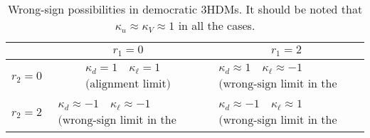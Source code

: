 \documentclass[11pt]{article}
\begin{document}
\begin{table}[h]
\centering
\begin{tabular}{c | c | c }
\hline\hline
& $r_1=0$ & $r_1=2$\\
\hline
$r_2=0$ &  $\begin{matrix} \kappa_d = 1 \quad \kappa_\ell = 1 \\ \text{(alignment limit)} \end{matrix} $ &  $\begin{matrix} \kappa_d \approx 1 \quad \kappa_\ell \approx -1  \\ \text{(wrong-sign limit in the type-X 2HDM)} \end{matrix}$  \\
\hline
$r_2=2$ &  $\begin{matrix} \kappa_d \approx -1 \quad \kappa_\ell \approx -1 \\ \text{(wrong-sign limit in the type-II 2HDM)} \end{matrix}$   &  $\begin{matrix} \kappa_d \approx -1 \quad \kappa_\ell \approx 1 \\ \text{(wrong-sign limit in the type-Y 2HDM)} \end{matrix}$    \\
\hline
\end{tabular}
\caption{\label{tab:3HDM wrong sign} Wrong-sign possibilities in democratic 3HDMs.  
It should be noted that $\kappa_u \approx \kappa_V \approx 1$ in all the cases.  }
\end{table}
\end{document}
